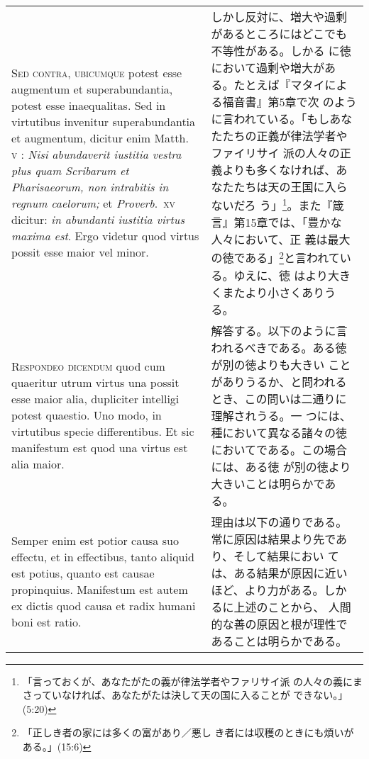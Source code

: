 \documentclass[10pt]{jsarticle}
\begin{document}
\begin{longtable}{p{21em}p{21em}}
\\



 {\scshape Sed contra, ubicumque} potest esse augmentum et
 superabundantia, potest esse inaequalitas. Sed in virtutibus
 invenitur superabundantia et augmentum, dicitur enim Matth.~{\scshape
 v} : {\itshape Nisi abundaverit iustitia vestra plus quam Scribarum
 et Pharisaeorum, non intrabitis in regnum caelorum;} et {\itshape
 Proverb}.~{\scshape xv} dicitur: {\itshape in abundanti iustitia
 virtus maxima est}. Ergo videtur quod virtus possit esse maior vel
 minor.

 
&

 しかし反対に、増大や過剰があるところにはどこでも不等性がある。しかる
 に徳において過剰や増大がある。たとえば『マタイによる福音書』第5章で次
 のように言われている。「もしあなたたちの正義が律法学者やファイリサイ
 派の人々の正義よりも多くなければ、あなたたちは天の王国に入らないだろ
 う」\footnote{「言っておくが、あなたがたの義が律法学者やファリサイ派
 の人々の義にまさっていなければ、あなたがたは決して天の国に入ることが
 できない。」(5:20)}。また『箴言』第15章では、「豊かな人々において、正
 義は最大の徳である」\footnote{「正しき者の家には多くの富があり／悪し
 き者には収穫のときにも煩いがある。」(15:6)}と言われている。ゆえに、徳
 はより大きくまたより小さくありうる。
 

\\


 {\scshape Respondeo dicendum} quod cum quaeritur utrum virtus una
 possit esse maior alia, dupliciter intelligi potest quaestio. Uno
 modo, in virtutibus specie differentibus. Et sic manifestum est quod
 una virtus est alia maior.
 
&

 解答する。以下のように言われるべきである。ある徳が別の徳よりも大きい
 ことがありうるか、と問われるとき、この問いは二通りに理解されうる。一
 つには、種において異なる諸々の徳においてである。この場合には、ある徳
 が別の徳より大きいことは明らかである。

\\

 Semper enim est potior causa suo effectu, et
 in effectibus, tanto aliquid est potius, quanto est causae
 propinquius. Manifestum est autem ex dictis quod causa et radix
 humani boni est ratio.
 
&

 理由は以下の通りである。常に原因は結果より先であり、そして結果におい
 ては、ある結果が原因に近いほど、より力がある。しかるに上述のことから、
 人間的な善の原因と根が理性であることは明らかである。


\end{longtable}
\end{document}
